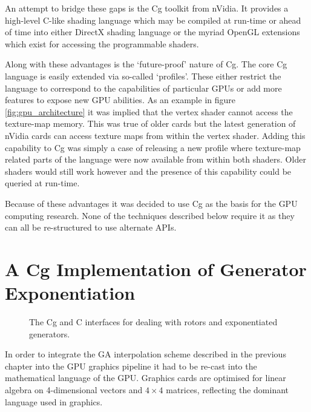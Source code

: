 An attempt to bridge these gaps is the Cg toolkit\cite{nvidia:cgtoolkit} from nVidia.
It provides a high-level C-like shading language which may be compiled at run-time or
ahead of time into either DirectX shading language or the myriad OpenGL extensions
which exist for accessing the programmable shaders. 

Along with these advantages is the `future-proof' nature of Cg. The core Cg language
is easily extended via so-called `profiles'. These either restrict the language to
correspond to the capabilities of particular GPUs or add more features to expose
new GPU abilities. As an example in figure \ref{fig:gpu_architecture} it was implied
that the vertex shader cannot access the texture-map memory. This was true
of older cards but the latest generation of nVidia cards can
access texture maps from within the vertex shader\cite{nvidia:sm3unleashed}. Adding this
capability to Cg was simply a case of releasing a new profile where texture-map related
parts of the language were now available from within both shaders. Older shaders
would still work however and the presence of this capability could be queried
at run-time.

Because of these advantages it was decided to use Cg as the basis for the GPU
computing research. None of the techniques described below require it as they
can all be re-structured to use alternate APIs.

\section{A Cg Implementation of Generator Exponentiation}

\begin{figure}[p]
\centering
{}
\caption{\label{fig:rotortools}The Cg and C interfaces for dealing with rotors and
  exponentiated generators.}
\end{figure}

In order to integrate the GA interpolation scheme described in the previous 
chapter into the GPU graphics pipeline it had to be re-cast into the 
mathematical language of the GPU. Graphics cards are optimised for 
linear algebra on 4-dimensional vectors and $4\times4$ matrices, reflecting
the dominant language used in graphics. 

